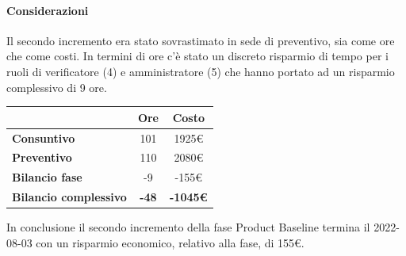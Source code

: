 \paragraph{Considerazioni} \hfill \break
Il secondo incremento era stato sovrastimato in sede di preventivo, sia come ore che come costi. In termini di ore c'è stato un discreto risparmio di tempo per i ruoli di verificatore (4) e amministratore (5) che hanno portato ad un risparmio complessivo di 9 ore.
\begin{center}
	\renewcommand{\arraystretch}{1.8}
	\begin{tabular}{ | l |c|c| }
    \hline
    & \textbf{Ore} & \textbf{Costo} \\
	\hline
    \textbf{Consuntivo} & 101 & 1925\euro \\
    \hline
    \textbf{Preventivo} & 110 & 2080\euro \\
    \hline
    \textbf{Bilancio fase} & -9 & -155\euro \\
    \hline
    \textbf{Bilancio complessivo} & \textbf{-48} & \textbf{-1045\euro} \\
    \hline
    \end{tabular}
\end{center}
In conclusione il secondo incremento della fase Product Baseline termina il 2022-08-03 con un risparmio economico, relativo alla fase, di 155€.

